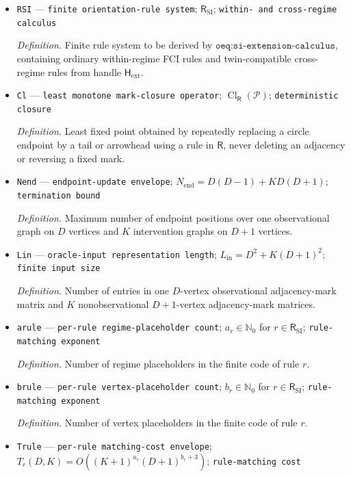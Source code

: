 \documentclass{article}
\begin{document}
\begin{itemize}
  \item \texttt{RSI} --- \texttt{finite orientation-\allowbreak{}rule system}; \(\mathsf R_{\mathrm{SI}}\); \texttt{within-\allowbreak{} and cross-\allowbreak{}regime calculus}
  \par\smallskip\noindent\emph{Definition.} Finite rule system to be derived by \(\texttt{oeq:si-extension-calculus}\), containing ordinary within-regime FCI rules and twin-compatible cross-regime rules from handle \(\mathsf H_{\mathrm{ext}}\).
  \item \texttt{Cl} --- \texttt{least monotone mark-\allowbreak{}closure operator}; \(\operatorname{Cl}_{\mathsf R}(\mathcal P)\); \texttt{deterministic closure}
  \par\smallskip\noindent\emph{Definition.} Least fixed point obtained by repeatedly replacing a circle endpoint by a tail or arrowhead using a rule in \(\mathsf R\), never deleting an adjacency or reversing a fixed mark.
  \item \texttt{Nend} --- \texttt{endpoint-\allowbreak{}update envelope}; \(N_{\mathrm{end}}=D(D-1)+KD(D+1)\); \texttt{termination bound}
  \par\smallskip\noindent\emph{Definition.} Maximum number of endpoint positions over one observational graph on \(D\) vertices and \(K\) intervention graphs on \(D+1\) vertices.
  \item \texttt{Lin} --- \texttt{oracle-\allowbreak{}input representation length}; \(L_{\mathrm{in}}=D^2+K(D+1)^2\); \texttt{finite input size}
  \par\smallskip\noindent\emph{Definition.} Number of entries in one \(D\)-vertex observational adjacency-mark matrix and \(K\) nonobservational \(D+1\)-vertex adjacency-mark matrices.
  \item \texttt{arule} --- \texttt{per-\allowbreak{}rule regime-\allowbreak{}placeholder count}; \(a_r\in\mathbb N_0\) for \(r\in\mathsf R_{\mathrm{SI}}\); \texttt{rule-\allowbreak{}matching exponent}
  \par\smallskip\noindent\emph{Definition.} Number of regime placeholders in the finite code of rule \(r\).
  \item \texttt{brule} --- \texttt{per-\allowbreak{}rule vertex-\allowbreak{}placeholder count}; \(b_r\in\mathbb N_0\) for \(r\in\mathsf R_{\mathrm{SI}}\); \texttt{rule-\allowbreak{}matching exponent}
  \par\smallskip\noindent\emph{Definition.} Number of vertex placeholders in the finite code of rule \(r\).
  \item \texttt{Trule} --- \texttt{per-\allowbreak{}rule matching-\allowbreak{}cost envelope}; \(T_r(D,K)=O((K+1)^{a_r}(D+1)^{b_r+3})\); \texttt{rule-\allowbreak{}matching cost}

\end{itemize}
\end{document}
